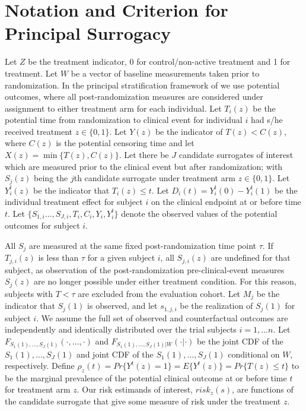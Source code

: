 \documentclass[times, doublespace]{simauth}
\begin{document}
\section{Notation and Criterion for Principal Surrogacy} \label{DEF}
Let $Z$ be the treatment indicator, 0 for control/non-active treatment and 1 for treatment. Let $W$ be a vector of baseline measurements taken prior to randomization. In the principal stratification framework of \citet{Frangakis02} we use potential outcomes, where all post-randomization measures are considered under assignment to either treatment arm for each individual. Let $T_i(z)$ be the potential time from randomization to clinical event for individual $i$ had s/he received treatment $z\in \{0,1\}$. Let $Y(z)$ be the indicator of $T(z)<C(z)$, where $C(z)$ is the potential censoring time and let $X(z)=\min\{T(z),C(z)\}$. Let there be $J$ candidate surrogates of interest which are measured prior to the clinical event but after randomization; with $S_{j}(z)$ being the $j$th candidate surrogate under treatment arm $z\in \{0,1\}$. Let $Y_{i}^{t}(z)$ be the indicator that $T_i(z)\leq t$. Let $D_i(t)=Y_{i}^{t}(0)-Y_{i}^{t}(1)$ be the individual treatment effect for subject $i$ on the clinical endpoint at or before time $t$. Let $\{S_{1,i}\ldots,S_{J,i}, T_i, C_i, Y_i, Y_{i}^{t} \}$ denote the observed values of the potential outcomes for subject $i$. 

All $S_j$ are measured at the same fixed post-randomization time point $\tau$. If $T_{j,i}(z)$ is less than $\tau$ for a given subject $i$, all $S_{j,i}(z)$ are undefined for that subject, as observation of the post-randomization pre-clinical-event measures $S_{j}(z)$ are no longer possible under either treatment condition. For this reason, subjects with $T< \tau$ are excluded from the evaluation cohort. Let $M_j$ be the indicator that $S_{j}(1)$ is observed, and let $s_{1,j,i}$ be the realization of $S_{j}(1)$ for subject $i$. We assume the full set of observed and counterfactual outcomes are independently and identically distributed over the trial subjects $i= 1, \ldots n$. Let $F_{S_1(1), \ldots, S_J(1)}(\cdot,\dots,\cdot)$ and $F_{S_1(1), \ldots, S_J(1)|W}(\cdot|\cdot)$ be the joint CDF of the $S_1(1), \ldots, S_J(1)$ and joint CDF of the $S_1(1), \ldots, S_J(1)$ conditional on $W$, respectively. Define $\rho_z(t)=Pr\{Y^t(z)=1\}=E\{Y^t(z)\}=Pr\{T(z)\leq t\}$ to be the marginal prevalence of the potential clinical outcome at or before time $t$ for treatment arm $z$. Our risk estimands of interest, $risk_z(s)$, are functions of the candidate surrogate that give some measure of risk under the treatment $z$. 
\end{document}
